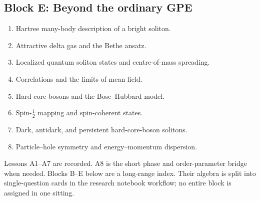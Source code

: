 \subsection{Block E: Beyond the ordinary GPE}
\begin{enumerate}[label=E\arabic*.]
  \item Hartree many-body description of a bright soliton.
  \item Attractive delta gas and the Bethe ansatz.
  \item Localized quantum soliton states and centre-of-mass spreading.
  \item Correlations and the limits of mean field.
  \item Hard-core bosons and the Bose--Hubbard model.
  \item Spin-$\tfrac12$ mapping and spin-coherent states.
  \item Dark, antidark, and persistent hard-core-boson solitons.
  \item Particle--hole symmetry and energy--momentum dispersion.
\end{enumerate}

Lessons A1--A7 are recorded. A8 is the short phase and order-parameter bridge when needed. Blocks B--E below are a long-range index. Their algebra is split into single-question cards in the research notebook workflow; no entire block is assigned in one sitting.
